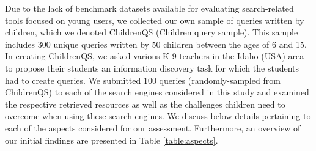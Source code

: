 \documentclass{sig-alternate-05-2015}
\begin{document}
Due to the lack of benchmark datasets available for evaluating search-related tools focused on young users, we collected our own sample of queries written by children, which we denoted ChildrenQS (Children query sample). This sample includes 300 unique queries written by 50 children between the ages of 6 and 15. In creating ChildrenQS, we asked various K-9   teachers in the Idaho (USA) area to propose their students an information discovery task for which the students had to create queries. 
We submitted 100 queries (randomly-sampled from ChildrenQS) to each of the search engines considered in this study and examined the respective retrieved resources as well as the challenges children need to overcome when using these search engines. We discuss below details pertaining to each of the aspects  considered for our assessment. Furthermore, an overview of our initial findings are presented in Table \ref{table:aspects}. \\
\end{document}
